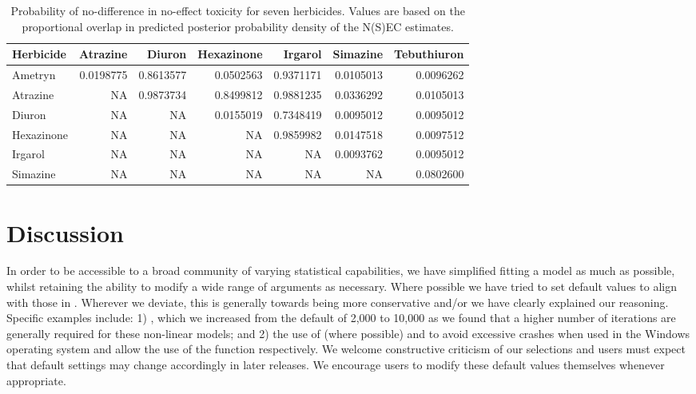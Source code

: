 \documentclass[
  shortnames]{jss}
\begin{document}
\begin{CodeChunk}
\begin{table}

\caption{\label{tab:probdiffs}Probability of no-difference in no-effect toxicity for seven herbicides. Values are based on the proportional overlap in predicted posterior probability density of the N(S)EC estimates.}
\centering
\begin{tabular}[t]{l|r|r|r|r|r|r}
\hline
Herbicide & Atrazine & Diuron & Hexazinone & Irgarol & Simazine & Tebuthiuron\\
\hline
Ametryn & 0.0198775 & 0.8613577 & 0.0502563 & 0.9371171 & 0.0105013 & 0.0096262\\
\hline
Atrazine & NA & 0.9873734 & 0.8499812 & 0.9881235 & 0.0336292 & 0.0105013\\
\hline
Diuron & NA & NA & 0.0155019 & 0.7348419 & 0.0095012 & 0.0095012\\
\hline
Hexazinone & NA & NA & NA & 0.9859982 & 0.0147518 & 0.0097512\\
\hline
Irgarol & NA & NA & NA & NA & 0.0093762 & 0.0095012\\
\hline
Simazine & NA & NA & NA & NA & NA & 0.0802600\\
\hline
\end{tabular}
\end{table}

\end{CodeChunk}

\hypertarget{discussion}{%
\section{Discussion}\label{discussion}}

In order to be accessible to a broad community of varying statistical capabilities, we have simplified fitting a  model as much as possible, whilst retaining the ability to modify a wide range of arguments as necessary. Where possible we have tried to set default values to align with those in . Wherever we deviate, this is generally towards being more conservative and/or we have clearly explained our reasoning. Specific examples include: 1) , which we increased from the  default of 2,000 to 10,000 as we found that a higher number of iterations are generally required for these non-linear models; and 2) the use of  (where possible) and  to avoid excessive  crashes when used in the Windows operating system and allow the use of the  function respectively. We welcome constructive criticism of our selections and users must expect that default settings may change accordingly in later releases. We encourage users to modify these default values themselves whenever appropriate.
\end{document}
